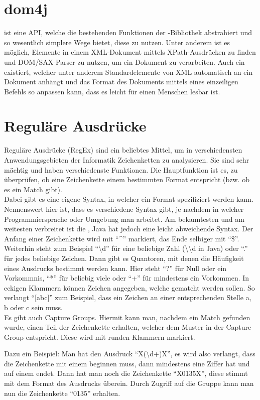\section{dom4j}

 ist eine API, welche die bestehenden Funktionen der -Bibliothek abstrahiert und so wesentlich simplere Wege bietet, diese zu nutzen\cite{dom4j}.
Unter anderem ist es möglich, Elemente in einem XML-Dokument mittels XPath-Ausdrücken zu finden und DOM/SAX-Parser zu nutzen, um ein Dokument zu verarbeiten.
Auch ein  existiert, welcher unter anderem Standardelemente von XML automatisch an ein Dokument anhängt und das Format des Dokuments mittels eines einzeiligen Befehls so anpassen kann, dass es leicht für einen Menschen lesbar ist.

\section{Reguläre Ausdrücke}

Reguläre Ausdrücke (RegEx) sind ein beliebtes Mittel, um in verschiedensten Anwendungsgebieten der Informatik Zeichenketten zu analysieren.
Sie sind sehr mächtig und haben verschiedenste Funktionen.
Die Hauptfunktion ist es, zu überprüfen, ob eine Zeichenkette einem bestimmten Format entspricht (bzw. ob es ein Match gibt).\\

Dabei gibt es eine eigene Syntax, in welcher ein Format spezifiziert werden kann\cite{regex101}.
Nennenswert hier ist, dass es verschiedene Syntax gibt, je nachdem in welcher Programmiersprache oder Umgebung man arbeitet.
Am bekanntesten und am weitesten verbreitet ist die , Java hat jedoch eine leicht abweichende Syntax.
Der Anfang einer Zeichenkette wird mit \enquote{\textasciicircum} markiert, das Ende selbiger mit \enquote{\$}.
Weiterhin steht zum Beispiel \enquote{\textbackslash d} für eine beliebige Zahl (\textbackslash\textbackslash d in Java) oder \enquote{.} für jedes beliebige Zeichen.
Dann gibt es Quantoren, mit denen die Häufigkeit eines Ausdrucks bestimmt werden kann.
Hier steht \enquote{?} für Null oder ein Vorkommnis, \enquote{*} für beliebig viele oder \enquote{+} für mindestens ein Vorkommen.
In eckigen Klammern können Zeichen angegeben, welche gematcht werden sollen. So verlangt \enquote{[abc]} zum Beispiel, dass ein Zeichen an einer entsprechenden Stelle a, b oder c sein muss.\\

Es gibt auch Capture Groups. Hiermit kann man, nachdem ein Match gefunden wurde, einen Teil der Zeichenkette erhalten, welcher dem Muster in der Capture Group entspricht. Diese wird mit runden Klammern markiert.

Dazu ein Beispiel: Man hat den Ausdruck \enquote{X(\textbackslash d+)X}, es wird also verlangt, dass die Zeichenkette mit einem  beginnen muss, dann mindestens eine Ziffer hat und auf einem  endet. 
Dann hat man noch die Zeichenkette \enquote{X0135X}, diese stimmt mit dem Format des Ausdrucks überein.
Durch Zugriff auf die Gruppe kann man nun die Zeichenkette \enquote{0135} erhalten.
